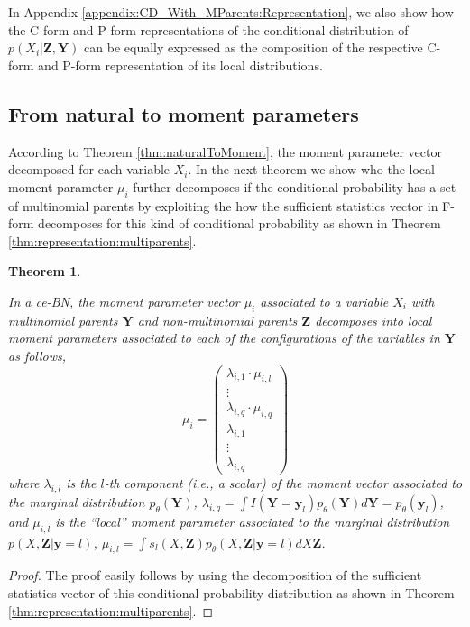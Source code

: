 \documentclass[11pt, oneside]{article}   	%
\newtheorem{theorem}{Theorem}
\newcommand{\bm}{\mathbf}
\numberwithin{figure}{section}
\numberwithin{equation}{section}
\numberwithin{table}{section}
\theoremstyle{definition}
\begin{document}
In Appendix \ref{appendix:CD_With_MParents:Representation}, we also show how the C-form and P-form representations of the conditional distribution of $p(X_i|\bm Z, \bm Y)$ can be equally expressed as the composition of the respective C-form and P-form representation of its local distributions. 


\subsection{From natural to moment parameters} \label{Section:CD_With_MParents:NaturalToMoment}

According to Theorem \ref{thm:naturalToMoment}, the moment parameter vector decomposed for each variable $X_i$. In the next theorem we show who the local moment parameter $\mu_i$ further decomposes if the conditional probability has a set of multinomial parents by exploiting the how the sufficient statistics vector in F-form decomposes for this kind of conditional probability as shown in Theorem \ref{thm:representation:multiparents}.

\begin{theorem}
\label{thm:naturalToMoment:multiparents}

In a ce-BN,  the moment parameter vector $\mu_i$ associated to a variable $X_i$ with multinomial parents $\bm Y$ and non-multinomial parents $\bm Z$ decomposes into local moment parameters associated to each of the configurations of the variables in $\bm Y$ as follows,
$$
\mu_i =  
\begin{pmatrix}
\lambda_{i,1}\cdot \mu_{i,l}\\
\vdots \\
\lambda_{i,q}\cdot \mu_{i,q}\\
\lambda_{i,1} \\
\vdots \\
\lambda_{i,q}
\end{pmatrix}
$$
\noindent where  $\lambda_{i,l}$ is the $l$-th component (i.e., a scalar) of the moment vector associated to the marginal distribution $p_\theta(\bm Y)$,  $\lambda_{i,q} = \int I(\bm Y = \bm y_l) p_\theta(\bm Y) d\bm Y= p_\theta(\bm y_l)$, and $\mu_{i,l}$  is the ``local'' moment parameter associated to the marginal distribution $p(X,\bm Z| \bm y = l)$, $\mu_{i,l}= \int s_l(X, \bm Z)p_\theta(X,\bm Z|\bm y = l) dX\bm Z$. 

\end{theorem}
\begin{proof}
The proof easily follows by using the decomposition of the sufficient statistics vector of this conditional probability distribution as shown in Theorem \ref{thm:representation:multiparents}.
\end{proof}
\end{document}
